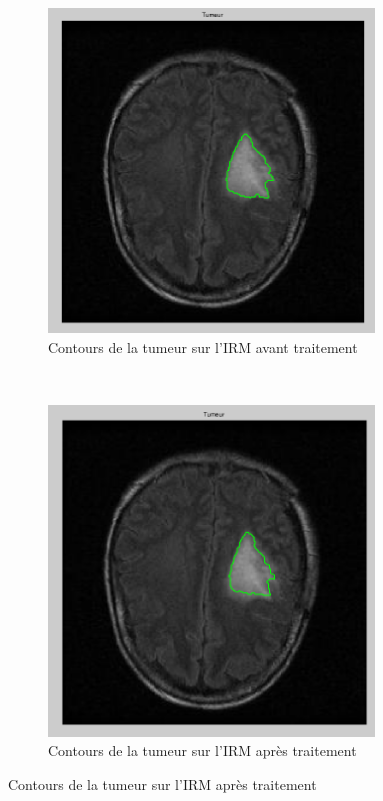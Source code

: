 	\begin{figure}[t!]
    \centering
    \begin{subfigure}[b]{0.5\textwidth}
        \centering
        \includegraphics[width=0.95\textwidth]{images/3-tumeur1.png}
	\caption{Contours de la tumeur sur l'IRM avant traitement}\label{3irm1}
    \end{subfigure}%
    ~ 
    \begin{subfigure}[b]{0.5\textwidth}
        \centering
        \includegraphics[width=0.95\textwidth]{images/3-tumeur2.png}
	\caption{Contours de la tumeur sur l'IRM après traitement}\label{3irm2}
    \end{subfigure}
\end{figure}

